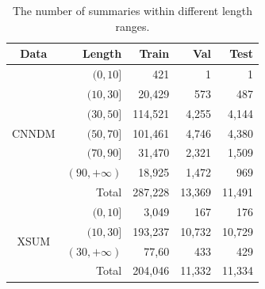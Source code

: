\begin{table}[th]
	\scriptsize
	\centering
	\begin{tabular}{|c|r|rrr|}
		\hline
		\bf Data& \bf Length& \bf Train & \bf Val & \bf Test \\ 
		\hline
		\multirow{7}{*}{CNNDM} 
		&$(0,10]$ & 421 &1 &1 \\
		& $(10,30]$ & 20,429&573 & 487\\
		& $(30,50]$ & 114,521 &4,255&4,144 \\
		& $(50,70]$& 101,461 & 4,746 &4,380 \\
		& $(70,90]$ & 31,470 & 2,321 & 1,509\\
		& $(90,+\infty)$ & 18,925&1,472 &969 \\
		   		\cline{2-5}
		&Total &287,228&13,369&11,491 \\
	    \hline
	    \multirow{4}{*}{XSUM} 
	    &$(0,10]$ & 3,049 & 167 & 176 \\
	    & $(10,30]$ & 193,237 & 10,732 & 10,729 \\
	    & $(30,+\infty)$ & 77,60 & 433 & 429 \\
	       		\cline{2-5}
	    &Total &204,046&11,332&11,334\\
		\hline
	\end{tabular}
	\caption{The number of summaries within different length ranges.}
	\label{tab:lendis}
\end{table}

